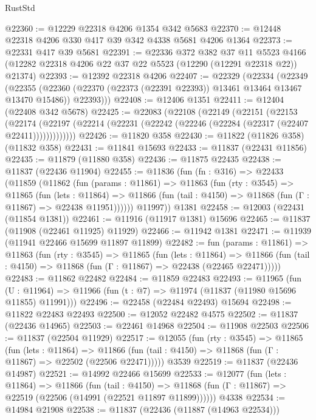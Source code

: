 \begin{lexlean}{RustStd}
\begin{coremodule}
@22360 := @12229 @22318 @4206 @1354 @342 @5683
@22370 := @12448 @22318 @4206 @330 @417 @39 @342 @4338 @5681 @4206 @1364
@22373 := @22331 @417 @39 @5681
@22391 := @22336
    @372
    @382
    @37
    @11
    @5523
    @4166
    (@12282 @22318 @4206 @22 @37 @22 @5523 (@12290 (@12291 @22318 @22)) @21374)
@22393 := @12392 @22318 @4206
@22407 := @22329
    (@22334
      (@22349
        (@22355
          (@22360 (@22370 (@22373 (@22391 @22393)) @13461 @13464 @13467 @13470 @15486))
          @22393)))
@22408 := @12406 @1351
@22411 := @12404 (@22408 @342 @5678)
@22425 := @22083
    (@22108
      (@22149
        (@22151
          (@22153
            (@22174
              (@22197 (@22214 (@22231 (@22242 (@22246 (@22284 (@22317 (@22407 @22411)))))))))))))
@22426 := @11820 @358
@22430 := @11822 (@11826 @358) (@11832 @358)
@22431 := @11841 @15693
@22433 := @11837 (@22431 @11856)
@22435 := @11879 (@11880 @358)
@22436 := @11875 @22435
@22438 := @11837 (@22436 @11904)
@22455 := @11836
    (fun (fn : @316) =>
    @22433
      (@11859
        (@11862
          (fun (params : @11861) =>
          @11863
            (fun (rty : @3545) =>
            @11865
              (fun (lets : @11864) =>
              @11866 (fun (tail : @4150) => @11868 (fun (Γ : @11867) => @22438 @11951))))))
        @11997))
    @1381
@22458 := @12003 (@22431 (@11854 @1381))
@22461 := @11916 (@11917 @1381) @15696
@22465 := @11837 (@11908 (@22461 @11925) @11929)
@22466 := @11942 @1381
@22471 := @11939 (@11941 @22466 @15699 @11897 @11899)
@22482 := fun (params : @11861) =>
  @11863
    (fun (rty : @3545) =>
    @11865
      (fun (lets : @11864) =>
      @11866 (fun (tail : @4150) => @11868 (fun (Γ : @11867) => @22438 (@22465 @22471)))))
@22483 := @11862 @22482
@22484 := @11859 @22483
@22493 := @11965
    (fun (U : @11964) => @11966 (fun (t : @7) => @11974 (@11837 (@11980 @15696 @11855) @11991)))
@22496 := @22458 (@22484 @22493) @15694
@22498 := @11822 @22483 @22493
@22500 := @12052 @22482 @4575
@22502 := @11837 (@22436 @14965)
@22503 := @22461 @14968
@22504 := @11908 @22503
@22506 := @11837 (@22504 @11929)
@22517 := @12055
    (fun (rty : @3545) =>
    @11865
      (fun (lets : @11864) =>
      @11866 (fun (tail : @4150) => @11868 (fun (Γ : @11867) => @22502 (@22506 @22471)))))
    @3539
@22519 := @11837 (@22436 @14987)
@22521 := @14992 @22466 @15699
@22533 := @12077
    (fun (lets : @11864) =>
    @11866
      (fun (tail : @4150) =>
      @11868 (fun (Γ : @11867) => @22519 (@22506 (@14991 (@22521 @11897 @11899))))))
    @4338
@22534 := @14984 @21908
@22538 := @11837 (@22436 (@11887 (@14963 @22534)))

\end{coremodule}
\end{lexlean}
